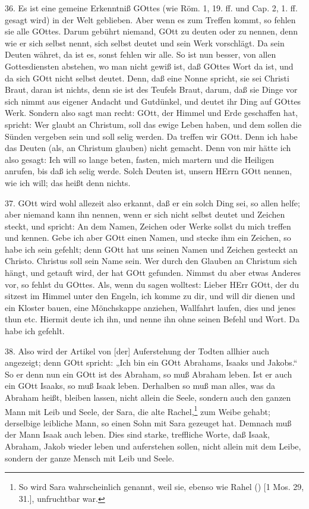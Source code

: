36. Es ist eine gemeine Erkenntniß GOttes (wie Röm. 1, 19. ff. und Cap. 2, 1. ff. gesagt wird) in der Welt geblieben. Aber wenn es zum Treffen kommt, so fehlen sie alle GOttes. Darum gebührt niemand, GOtt zu deuten oder zu nennen, denn wie er sich selbst nennt, sich selbst deutet und sein Werk vorschlägt. Da sein Deuten währet, da ist es, sonst fehlen wir alle. So ist nun besser, von allen Gottesdiensten abstehen, wo man nicht gewiß ist, daß GOttes Wort da ist, und da sich GOtt nicht selbst deutet. Denn, daß eine Nonne spricht, sie sei Christi Braut, daran ist nichts, denn sie ist des Teufels Braut, darum, daß sie Dinge vor sich nimmt aus eigener Andacht und Gutdünkel, und deutet ihr Ding auf GOttes Werk. Sondern also sagt man recht: GOtt, der Himmel und Erde geschaffen hat, spricht: Wer glaubt an Christum, soll das ewige Leben haben, und dem sollen die Sünden vergeben sein und soll selig werden. Da treffen wir GOtt. Denn ich habe das Deuten (als, an Christum glauben) nicht gemacht. Denn von mir hätte ich also gesagt: Ich will so lange beten, fasten, mich martern und die Heiligen anrufen, bis daß ich selig werde. Solch Deuten ist, unsern HErrn GOtt nennen, wie ich will; das heißt denn nichts.

37. GOtt wird wohl allezeit also erkannt, daß er ein solch Ding sei, so allen helfe; aber niemand kann ihn nennen, wenn er sich nicht selbst deutet und Zeichen steckt, und spricht: An dem Namen, Zeichen oder Werke sollst du mich treffen und kennen. Gebe ich aber GOtt einen Namen, und stecke ihm ein Zeichen, so habe ich sein gefehlt; denn GOtt hat uns seinen Namen und Zeichen gesteckt an Christo. Christus soll sein Name sein. Wer durch den Glauben an Christum sich hängt, und getauft wird, der hat GOtt gefunden. Nimmst du aber etwas Anderes vor, so fehlst du GOttes. Als, wenn du sagen wolltest: Lieber HErr GOtt, der du sitzest im Himmel unter den Engeln, ich komme zu dir, und will dir dienen und ein Kloster bauen, eine Mönchskappe anziehen, Wallfahrt laufen, dies und jenes thun etc. Hiermit deute ich ihn, und nenne ihn ohne seinen Befehl und Wort. Da habe ich gefehlt.

38. Also wird der Artikel von [der] Auferstehung der Todten allhier auch angezeigt; denn GOtt spricht: „Ich bin ein GOtt Abrahams, Isaaks und Jakobs.“ So er denn nun ein GOtt ist des Abraham, so muß Abraham leben. Ist er auch ein GOtt Isaaks, so muß Isaak leben. Derhalben so muß man alles, was da Abraham heißt, bleiben lassen, nicht allein die Seele, sondern auch den ganzen Mann mit Leib und Seele, der Sara, die alte Rachel,\footnote{So wird Sara wahrscheinlich genannt, weil sie, ebenso wie Rahel () [1 Mos. 29, 31.], unfruchtbar war.} zum Weibe gehabt; derselbige leibliche Mann, so einen Sohn mit Sara gezeuget hat. Demnach muß der Mann Isaak auch leben. Dies sind starke, treffliche Worte, daß Isaak, Abraham, Jakob wieder leben und auferstehen sollen, nicht allein mit dem Leibe, sondern der ganze Mensch mit Leib und Seele.


